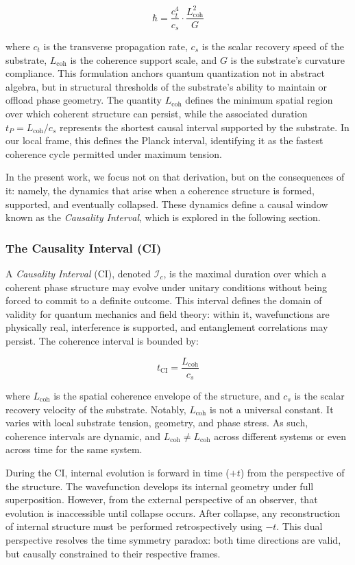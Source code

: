 \documentclass[preprints,article,submit,pdftex,moreauthors]{Definitions/mdpi}
\begin{document}
\[
\hbar = \frac{c_t^4}{c_s} \cdot \frac{L_{\text{coh}}^2}{G}
\]

where \( c_t \) is the transverse propagation rate, \( c_s \) is the scalar recovery speed of the substrate, \( L_{\text{coh}} \) is the coherence support scale, and \( G \) is the substrate’s curvature compliance. This formulation anchors quantum quantization not in abstract algebra, but in structural thresholds of the substrate’s ability to maintain or offload phase geometry. The quantity \( L_{\text{coh}} \) defines the minimum spatial region over which coherent structure can persist, while the associated duration \( t_P = L_{\text{coh}} / c_s \) represents the shortest causal interval supported by the substrate. In our local frame, this defines the Planck interval, identifying it as the fastest coherence cycle permitted under maximum tension.

In the present work, we focus not on that derivation, but on the consequences of it: namely, the dynamics that arise when a coherence structure is formed, supported, and eventually collapsed. These dynamics define a causal window known as the \textit{Causality Interval}, which is explored in the following section.



\subsubsection{The Causality Interval (CI)}

A \textit{Causality Interval} (CI), denoted \( \mathcal{I}_c \), is the maximal duration over which a coherent phase structure may evolve under unitary conditions without being forced to commit to a definite outcome. This interval defines the domain of validity for quantum mechanics and field theory: within it, wavefunctions are physically real, interference is supported, and entanglement correlations may persist. The coherence interval is bounded by:

\[
t_{\text{CI}} = \frac{L_{\text{coh}}}{c_s}
\]

where \( L_{\text{coh}} \) is the spatial coherence envelope of the structure, and \( c_s \) is the scalar recovery velocity of the substrate. Notably, \( L_{\text{coh}} \) is not a universal constant. It varies with local substrate tension, geometry, and phase stress. As such, coherence intervals are dynamic, and \( L_{\text{coh}} \neq L_{\text{coh}} \) across different systems or even across time for the same system.

During the CI, internal evolution is forward in time (\( +t \)) from the perspective of the structure. The wavefunction develops its internal geometry under full superposition. However, from the external perspective of an observer, that evolution is inaccessible until collapse occurs. After collapse, any reconstruction of internal structure must be performed retrospectively using \( -t \). This dual perspective resolves the time symmetry paradox: both time directions are valid, but causally constrained to their respective frames.
\end{document}
